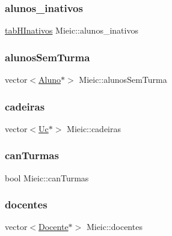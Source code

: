 \subsubsection{\texorpdfstring{alunos\+\_\+inativos}{alunos\_inativos}}
{\footnotesize\ttfamily \hyperlink{mieic_8h_a48894bb701fe596264988f4453ff8f3f}{tab\+H\+Inativos} Mieic\+::alunos\+\_\+inativos\hspace{0.3cm}{\ttfamily [private]}}

\hypertarget{class_mieic_a807d4f744ae0543caeec3f9c04e714f7}{}\label{class_mieic_a807d4f744ae0543caeec3f9c04e714f7} 
\subsubsection{\texorpdfstring{alunos\+Sem\+Turma}{alunosSemTurma}}
{\footnotesize\ttfamily vector$<$\hyperlink{class_aluno}{Aluno}$\ast$$>$ Mieic\+::alunos\+Sem\+Turma\hspace{0.3cm}{\ttfamily [private]}}

\hypertarget{class_mieic_afc2464f50b64724c74c369a252d10a0f}{}\label{class_mieic_afc2464f50b64724c74c369a252d10a0f} 
\subsubsection{\texorpdfstring{cadeiras}{cadeiras}}
{\footnotesize\ttfamily vector$<$\hyperlink{class_uc}{Uc}$\ast$$>$ Mieic\+::cadeiras\hspace{0.3cm}{\ttfamily [private]}}

\hypertarget{class_mieic_a5083c06ef88abf95375f127dbc0829dc}{}\label{class_mieic_a5083c06ef88abf95375f127dbc0829dc} 
\subsubsection{\texorpdfstring{can\+Turmas}{canTurmas}}
{\footnotesize\ttfamily bool Mieic\+::can\+Turmas\hspace{0.3cm}{\ttfamily [private]}}

\hypertarget{class_mieic_a7adb63b4146994f9a4a83eab412d2cae}{}\label{class_mieic_a7adb63b4146994f9a4a83eab412d2cae} 
\subsubsection{\texorpdfstring{docentes}{docentes}}
{\footnotesize\ttfamily vector$<$\hyperlink{class_docente}{Docente}$\ast$$>$ Mieic\+::docentes\hspace{0.3cm}{\ttfamily [private]}}


